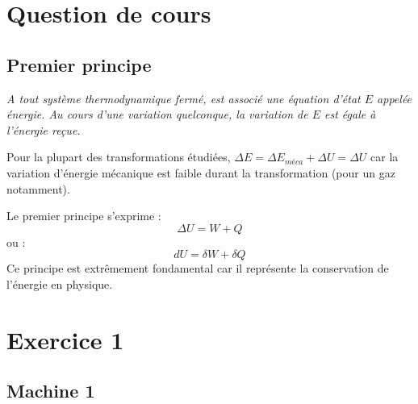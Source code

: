 \documentclass{report}
\begin{document}
\section*{Question de cours}

\subsection*{Premier principe}

\textit{A tout système thermodynamique fermé, est associé une équation d'état $E$ appelée énergie. Au cours d'une variation quelconque, la variation de $E$ est égale à l'énergie reçue.}

Pour la plupart des transformations étudiées, $\Delta E = \Delta E_{méca}+\Delta U =  \Delta U $ car la variation d'énergie mécanique est faible durant la transformation (pour un gaz notamment).

Le premier principe s'exprime :
\begin{equation}
	\Delta U = W+Q
\end{equation}
ou :
\begin{equation}
	d U = \delta W+ \delta Q
\end{equation}
Ce principe est extrêmement fondamental car il représente la conservation de l'énergie en physique.
 
\section*{Exercice 1}
\subsection*{Machine 1}
\end{document}
